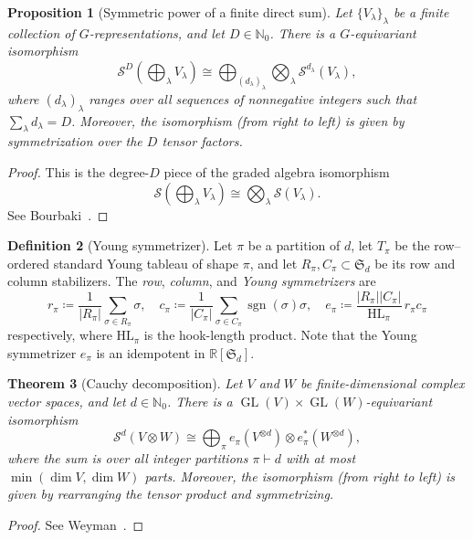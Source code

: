 \documentclass[11pt]{article}
\newcommand{\dsN}{\mathbb{N}}
\newcommand{\dsR}{\mathbb{R}}
\newcommand{\scS}{\mathcal{S}}
\newcommand{\GL}{\operatorname{GL}}
\newtheorem{theorem}{Theorem}[section]
\newtheorem{proposition}[theorem]{Proposition}
\theoremstyle{definition}
\newtheorem{definition}[theorem]{Definition}
\begin{document}
\begin{proposition}[Symmetric power of a finite direct sum]\label{prop:sym-direct-sum}
  Let $\{V_\lambda\}_\lambda$ be a finite collection of $G$-representations, and let $D\in\dsN_0$.
  There is a $G$-equivariant isomorphism
  \[
    \scS^D\!\left(\bigoplus_\lambda V_\lambda\right)
    \cong
    \bigoplus_{(d_\lambda)_\lambda}\bigotimes_\lambda \scS^{d_\lambda}(V_\lambda),
  \]
  where $(d_\lambda)_\lambda$ ranges over all sequences of nonnegative integers such that $\sum_\lambda d_\lambda=D$.
  Moreover, the isomorphism (from right to left) is given by symmetrization over the $D$ tensor factors.
\end{proposition}
\begin{proof}
  This is the degree-$D$ piece of the graded algebra isomorphism
  \[
    \scS\!\left(\bigoplus_\lambda V_\lambda\right)
    \cong
    \bigotimes_\lambda \scS(V_\lambda).
  \]
  See Bourbaki~\cite[Chapter III, \S6.6, Proposition 9]{Bourbaki1989}.
\end{proof}

\begin{definition}[Young symmetrizer]\label{def:young-symmetrizer}
  Let $\pi$ be a partition of $d$, let $T_\pi$ be the row--ordered standard Young tableau of shape $\pi$, and let $R_\pi,C_\pi\subset \mathfrak{S}_d$ be its row and column stabilizers.
  The \emph{row}, \emph{column}, and \emph{Young symmetrizers} are
  \[
    r_\pi\coloneq \frac{1}{|R_\pi|}\sum_{\sigma\in R_\pi}\sigma,
    \quad
    c_\pi\coloneq \frac{1}{|C_\pi|}\sum_{\sigma\in C_\pi}\operatorname{sgn}(\sigma)\sigma,
    \quad
    e_\pi\coloneq \frac{|R_\pi||C_\pi|}{\mathrm{HL}_\pi}\,r_\pi c_\pi
  \]
  respectively, where $\mathrm{HL}_\pi$ is the hook-length product.
  Note that the Young symmetrizer $e_\pi$ is an idempotent in $\dsR[\mathfrak{S}_d]$.
\end{definition}

\begin{theorem}[Cauchy decomposition]\label{thm:cauchy}
  Let $V$ and $W$ be finite-dimensional complex vector spaces, and let $d \in \dsN_0$.
  There is a $\GL(V)\times \GL(W)$-equivariant isomorphism
  \begin{equation}\label{eq:cauchy}
    \scS^d(V\otimes W)
    \cong
    \bigoplus_\pi
    e_\pi(V^{\otimes d})\otimes e_\pi^*(W^{\otimes d}),
  \end{equation}
  where the sum is over all integer partitions $\pi\vdash d$ with at most $\min(\dim V,\dim W)$ parts.
  Moreover, the isomorphism (from right to left) is given by rearranging the tensor product and symmetrizing.
\end{theorem}
\begin{proof}
  See Weyman~\cite[\S2.3, Corollary 2.3.3]{Weyman2003}.
\end{proof}
\end{document}
